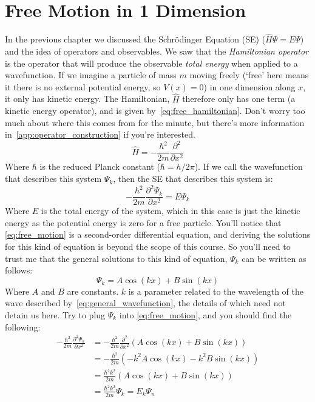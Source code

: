 \documentclass{memoir}[11pt,oneside,a4paper,openany]
\newcommand{\wf}{\ensuremath{\Psi}\xspace}
\begin{document}
\section{Free Motion in 1 Dimension}
In the previous chapter we discussed the Schr{\"o}dinger Equation (SE) ($\hat{H}\wf = E\wf$) and the idea of operators and observables. We saw that the \emph{Hamiltonian operator} is the operator that will produce the observable \emph{total energy} when applied to a wavefunction. If we imagine a particle of mass $m$ moving freely (`free' here means it there is no external potential energy, so $V(x)=0$) in one dimension along $x$, it only has kinetic energy. The Hamiltonian, $\hat{H}$ therefore only has one term (a kinetic energy operator), and is given by~\autoref{eq:free_hamiltonian}. Don't worry too much about where this comes from for the minute, but there's more information in~\autoref{app:operator_construction} if you're interested. 
\begin{equation}\label{eq:free_hamiltonian}
	\hat{H} = -\frac{\hbar^2}{2m} \frac{\partial^2}{\partial x^2}
\end{equation}
Where $\hbar$ is the reduced Planck constant ($\hbar = h/2\pi$). If we call the wavefunction that describes this system \wf$_k$, then the SE that describes this system is:
\begin{equation}\label{eq:free_motion}
	-\frac{\hbar^2}{2m} \frac{\partial^2\wf_k}{\partial x^2} = E \wf_k
\end{equation}
Where $E$ is the total energy of the system, which in this case is just the kinetic energy as the potential energy is zero for a free particle. You'll notice that \autoref{eq:free_motion} is a second-order differential equation, and deriving the solutions for this kind of equation is beyond the scope of this course. So you'll need to trust me that the general solutions to this kind of equation, $\wf_k$ can be written as follows:
\begin{equation}\label{eq:general_wavefunction}
	\wf_k = A\cos(kx)+B\sin(kx)
\end{equation}
Where $A$ and $B$ are constants. $k$ is a parameter related to the wavelength of the wave described by~\autoref{eq:general_wavefunction}, the details of which need not detain us here. Try to plug $\wf_k$ into \autoref{eq:free_motion}, and you should find the following:
\begin{align}
	-\frac{\hbar^2}{2m} \frac{\partial^2\wf_k}{\partial x^2} &= -\frac{\hbar^2}{2m} \frac{\partial^2}{\partial x^2}(A\cos(kx)+B\sin(kx)) \\ &= -\frac{\hbar^2}{2m}(-k^2 A\cos(kx) - k^2 B\sin(kx)) \\ &= \frac{\hbar^2k^2}{2m} (A\cos(kx) + B\sin(kx)) \\ &= \frac{\hbar^2k^2}{2m} \wf_k = E_k\wf_n
\end{align}
\end{document}
